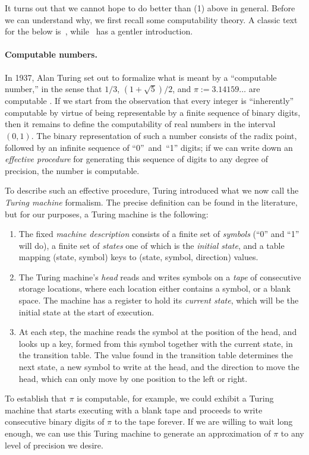 \documentclass[../generics]{subfiles}
\begin{document}
It turns out that we cannot hope to do better than (1) above in general. Before we can understand why, we first recall some computability theory. A classic text for the below is~\cite{cutland}, while~\cite{maccormick2018can} has a gentler introduction.

\paragraph{Computable numbers.}
In 1937, Alan Turing set out to formalize what is meant by a ``computable number,'' in the sense that $1/3$, $(1+\sqrt{5})/2$, and $\pi := 3.14159\ldots$ are computable \cite{turing}. If we start from the observation that every integer is ``inherently'' computable by virtue of being representable by a finite sequence of binary digits, then it remains to define the computability of real numbers in the interval $(0,1)$. The binary representation of such a number consists of the radix point, followed by an infinite sequence of ``0''~and~``1'' digits; if we can write down an \emph{effective procedure} for generating this sequence of digits to any degree of precision, the number is computable.

To describe such an effective procedure, Turing introduced what we now call the  \emph{Turing machine} formalism. The precise definition can be found in the literature, but for our purposes, a Turing machine is the following:
\begin{enumerate}
\item The fixed \emph{machine description} consists of a finite set of \emph{symbols} (``0'' and ``1'' will do), a finite set of \emph{states} one of which is the \emph{initial state}, and a table mapping (state, symbol) keys to (state, symbol, direction) values.

\item The Turing machine's \emph{head} reads and writes symbols on a \emph{tape} of consecutive storage locations, where each location either contains a symbol, or a blank space. The machine has a register to hold its \emph{current state}, which will be the initial state at the start of execution.

\item At each step, the machine reads the symbol at the position of the head, and looks up a key, formed from this symbol together with the current state, in the transition table. The value found in the transition table determines the next state, a new symbol to write at the head, and the direction to move the head, which can only move by one position to the left or right.
\end{enumerate}
To establish that $\pi$ is computable, for example, we could exhibit a Turing machine that starts executing with a blank tape and proceeds to write consecutive binary digits of $\pi$ to the tape forever. If we are willing to wait long enough, we can use this Turing machine to generate an approximation of $\pi$ to any level of precision we desire.
\end{document}

